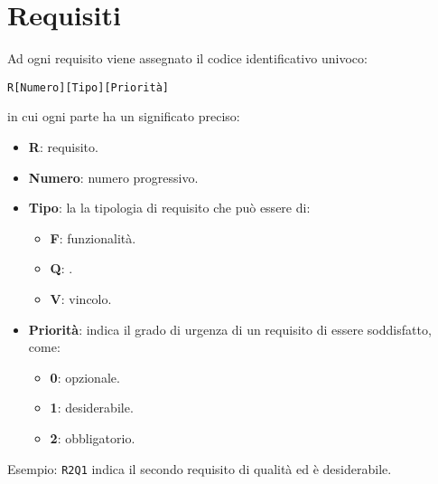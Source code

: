 \section{Requisiti}
Ad ogni requisito viene assegnato il codice identificativo univoco:
	\begin{center}
		\texttt{R[Numero][Tipo][Priorità]} 
	\end{center} 
	in cui ogni parte ha un significato preciso:
	\begin{itemize}
		\item \textbf{R}: requisito.
		\item \textbf{Numero}: numero progressivo.
		\item \textbf{Tipo}: la la tipologia di requisito che può essere di:
		\begin{itemize}
			\item \textbf{F}: funzionalità.
			\item \textbf{Q}: .
			\item \textbf{V}: vincolo.
		\end{itemize}
		\item \textbf{Priorità}: indica il grado di urgenza di un requisito di essere soddisfatto, come:
		\begin{itemize}
			\item \textbf{0}: opzionale.
			\item \textbf{1}: desiderabile.
			\item \textbf{2}: obbligatorio.
		\end{itemize}
	\end{itemize}
	

	Esempio: \texttt{R2Q1} indica il secondo requisito di qualità ed è desiderabile.\\
	
	

\newcommand{\decrZ}{\addtocounter{vaZ}{+1}} %
\newcommand{\addNumber}[0]{\thevaZ \decrZ} %
\addtocounter{vaZ}{1}%


